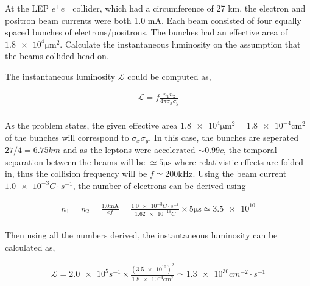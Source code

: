 \begin{problem}{1.11}
At the LEP $e^+e^-$ collider, which had a circumference of 27 km, the electron and positron beam currents were both 1.0 mA. Each beam consisted of four equally spaced bunches of electrons/positrons. The bunches had an effective area of $\num{1.8e4}\unit{\micro\metre^2}$.
Calculate the instantaneous luminosity on the assumption that the beams collided head-on.
\end{problem}
\begin{solution}
The instantaneous luminosity $\mathcal{L}$ could be computed as,

\begin{align*}
    \mathcal{L} = f\frac{n_1n_2}{4\pi \sigma_x \sigma_y}
\end{align*}\\
As the problem states, the given effective area $\num{1.8e4} \unit{\micro\meter^2}=\num{1.8e-4} \unit{\centi\meter^2}$ of the bunches will correspond to $\sigma_x \sigma_y$. In this case, the bunches are seperated $27/4 = 6.75 \unit{km}$ and as the leptons were accelerated $\sim 0.99c$, the temporal separation between the beams will be $\simeq 5 \unit{\micro\second}$ where relativistic effects are folded in, thus the collision frequency will be $f \simeq 200 \unit{\kilo\hertz}$. Using the beam current $\num{1.0e-3}\unit{C\cdot s^{-1}}$, the number of electrons can be derived using

\begin{align*}
    n_1 = n_2 = \frac{\num{1.0}\unit{\milli\ampere}}{ef}=\frac{\num{1.0e-3}\unit{C\cdot s^{-1}}}{\num{1.62e-19}\unit{C}} \times 5 \unit{\micro\second} \simeq \num{3.5e10}
\end{align*}\\
Then using all the numbers derived, the instantaneous luminosity can be calculated as,

\begin{align*}
    \mathcal{L} = \num{2.0e5} \unit{s^{-1}} \times \frac{\left( \num{3.5e10}\right)^2}{\num{1.8e-4}\unit{\centi\meter^2}} \simeq \num{1.3e30} \unit{cm^{-2}\cdot s^{-1}}
\end{align*}
\end{solution}\\